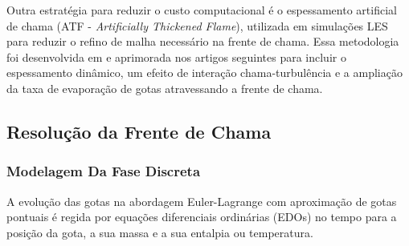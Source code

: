 Outra estratégia para reduzir o custo computacional é o espessamento artificial de chama (ATF - \emph{Artificially Thickened Flame}), utilizada em simulações LES para reduzir o refino de malha necessário na frente de chama.
Essa metodologia foi desenvolvida em \cite{SacomanoF2017PhD} e aprimorada nos artigos seguintes \cite{SacomanoF2017CF, SacomanoF2020CF} para incluir o espessamento dinâmico, um efeito de interação chama-turbulência e a ampliação da taxa de evaporação de gotas atravessando a frente de chama.


\subsection{Resolução da Frente de Chama} \label{sec:FGM}



\subsubsection{Modelagem Da Fase Discreta} \label{sec:gotas}

A evolução das gotas na abordagem Euler-Lagrange com aproximação de gotas pontuais é regida por equações diferenciais ordinárias (EDOs) no tempo para a posição da gota, a sua massa e a sua entalpia ou temperatura.


